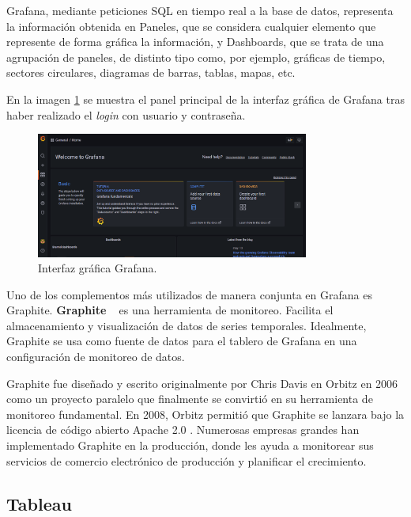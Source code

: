 \documentclass[a4paper, 12pt]{book}
\begin{document}
Grafana, mediante peticiones SQL en tiempo real a la base de datos, representa la
información obtenida en Paneles, que se considera cualquier elemento que represente de forma gráfica la información, y Dashboards, que se trata de una agrupación de paneles, de distinto tipo como, por ejemplo, gráficas de tiempo, sectores circulares, diagramas de barras, tablas, mapas, etc.

En la imagen \ref{figura:Grafana} se muestra  el panel principal de la interfaz gráfica de Grafana tras haber realizado el \emph{login} con usuario y contraseña.

\begin{figure}[ht]
        \centering
        \includegraphics[width=0.8\textwidth]{img/Grafana.png}
        \caption{Interfaz gráfica Grafana.}
        \label{figura:Grafana}
    \end{figure}

Uno de los complementos más utilizados de manera conjunta en Grafana es Graphite.
\textbf{Graphite} ~\cite{Graphite} es una herramienta de monitoreo. Facilita el almacenamiento y visualización de datos de series temporales. Idealmente, Graphite se usa como fuente de datos para el tablero de Grafana en una configuración de monitoreo de datos.

Graphite fue diseñado y escrito originalmente por Chris Davis en Orbitz en 2006 como un proyecto paralelo que finalmente se convirtió en su herramienta de monitoreo fundamental. En 2008, Orbitz permitió que Graphite se lanzara bajo la licencia de código abierto Apache 2.0 . Numerosas empresas grandes han implementado Graphite en la producción, donde les ayuda a monitorear sus servicios de comercio electrónico de producción y planificar el crecimiento.

\subsection{Tableau}
\label{sec:tableau}
\end{document}
